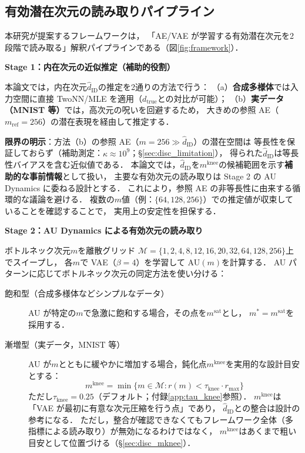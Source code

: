 \documentclass[11pt,a4paper]{jsarticle}
\newcommand{\dzopt}{m^*}
\newcommand{\dtrue}{d_{\mathrm{true}}}
\newcommand{\kap}{\kappa}
\newcommand{\dzsat}{m^{\mathrm{sat}}}
\newcommand{\mknee}{m^{\mathrm{knee}}}
\begin{document}
\subsection{有効潜在次元の読み取りパイプライン}\label{sec:framework_pipeline}

本研究が提案するフレームワークは，
「AE/VAE が学習する有効潜在次元を2段階で読み取る」解釈パイプラインである（図\ref{fig:framework}）．

\textbf{Stage 1：内在次元の近似推定（補助的役割）}

本論文では，内在次元$\hat{d}_\mathrm{ID}$の推定を2通りの方法で行う：
（a）\textbf{合成多様体}では入力空間に直接 TwoNN/MLE を適用（$\dtrue$との対比が可能）；
（b）\textbf{実データ（MNIST 等）}では，高次元の呪いを回避するため，
大きめの参照 AE（$m_{\mathrm{ref}} = 256$）の潜在表現を経由して推定する．

\textbf{限界の明示}：方法（b）の参照 AE（$m = 256 \gg \hat{d}_\mathrm{ID}$）の潜在空間は
等長性を保証しておらず（補助測定：$\kap \approx 10^9$；§\ref{sec:disc_limitation}），
得られた$\hat{d}_\mathrm{ID}$は等長性バイアスを含む近似値である．
本論文では，$\hat{d}_\mathrm{ID}$を$\mknee$の候補範囲を示す\textbf{補助的な事前情報}として扱い，
主要な有効次元の読み取りは Stage 2 の AU Dynamics に委ねる設計とする．
これにより，参照 AE の非等長性に由来する循環的な議論を避ける．
複数の$m$値（例：$\{64, 128, 256\}$）での推定値が収束していることを確認することで，
実用上の安定性を担保する．

\textbf{Stage 2：AU Dynamics による有効次元の読み取り}

ボトルネック次元$m$を離散グリッド
$\mathcal{M} = \{1, 2, 4, 8, 12, 16, 20, 32, 64, 128, 256\}$上でスイープし，
各$m$で VAE（$\beta = 4$）を学習して AU$(m)$を計算する．
AU パターンに応じてボトルネック次元の同定方法を使い分ける：

\begin{description}
  \item[飽和型（合成多様体などシンプルなデータ）]
        AU が特定の$m$で急激に飽和する場合，その点を$\dzsat$とし，
        $\dzopt = \dzsat$を採用する．
  \item[漸増型（実データ，MNIST 等）]
        AU が$m$とともに緩やかに増加する場合，鈍化点$\mknee$を実用的な設計目安とする：
        \begin{equation}
          \mknee = \min\{m \in \mathcal{M} : r(m) < \tau_{\mathrm{knee}} \cdot r_{\max}\}
          \label{eq:mknee}
        \end{equation}
        ただし$\tau_{\mathrm{knee}} = 0.25$（デフォルト；付録\ref{app:tau_knee}参照）．
        $\mknee$は「VAE が最初に有意な次元圧縮を行う点」であり，
        $\hat{d}_\mathrm{ID}$との整合は設計の参考になる．
        ただし，整合が確認できなくてもフレームワーク全体（多指標による読み取り）が無効になるわけではなく，
        $\mknee$はあくまで粗い目安として位置づける（§\ref{sec:disc_mknee}）．
\end{description}
\end{document}
